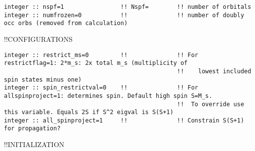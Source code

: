 \begin{verbatim}
integer :: nspf=1                !! Nspf=        !! number of orbitals
integer :: numfrozen=0           !!              !! number of doubly occ orbs (removed from calculation)
\end{verbatim}
!!{\large \quad CONFIGURATIONS}
\begin{verbatim}
integer :: restrict_ms=0         !!              !! For restrictflag=1: 2*m_s: 2x total m_s (multiplicity of 
                                                 !!    lowest included spin states minus one)
integer :: spin_restrictval=0    !!              !! For allspinproject=1: determines spin. Default high spin S=M_s.
                                                 !!  To override use this variable. Equals 2S if S^2 eigval is S(S+1)
integer :: all_spinproject=1     !!              !! Constrain S(S+1) for propagation?
\end{verbatim}
!!{\large \quad INITIALIZATION}
